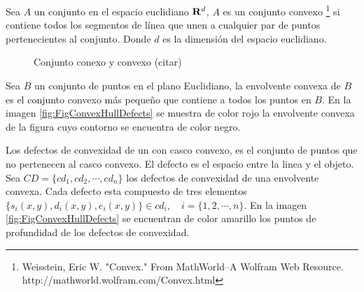 Sea $A$ un conjunto en el espacio euclidiano $\bold{R}^d$, $A$ es un conjunto convexo \footnote{Weisstein, Eric W. "Convex." From MathWorld--A Wolfram Web Resource. http://mathworld.wolfram.com/Convex.html} si contiene todos los segmentos de línea que unen a cualquier par de puntos pertenecientes al conjunto. Donde $d$ es la dimensión del espacio euclidiano. 
\begin{figure}[h!]
\centering
{} \hspace{10mm}
 \hspace{10mm}
\caption{Conjunto conexo y convexo (citar)}\label{fig:Sets}
\end{figure} 

Sea $B$ un conjunto de puntos en el plano Euclidiano, la envolvente convexa de $B$ es el conjunto convexo más pequeño que contiene a todos los puntos en $B$. En la imagen \ref{fig:FigConvexHullDefects} se muestra de color rojo la envolvente convexa de la figura cuyo contorno se encuentra de color negro. 

Los defectos de convexidad de un con casco convexo, es el conjunto de puntos que no pertenecen al casco convexo. El defecto es el espacio entre la linea y el objeto. Sea $CD=\lbrace cd_1, cd_2, \cdots, cd_n \rbrace$ los defectos de convexidad de una envolvente convexa. Cada defecto esta compuesto de tres elementos $\lbrace s_i(x,y),d_i(x,y),e_i(x,y) \rbrace \in cd_i, \quad i=\lbrace 1, 2, \cdots, n\rbrace$. En la imagen \ref{fig:FigConvexHullDefects} se encuentran de color amarillo los puntos de profundidad de los defectos de convexidad. 


